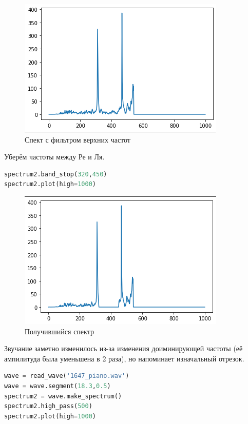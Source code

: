 \begin{figure}[H]
	\begin{center}
		\includegraphics[scale=1]{fig/lab01/lab1_5.png}
		\caption{Спект с фильтром верхних частот}
	\end{center}
\end{figure}

Уберём частоты между Ре и Ля.

\begin{lstlisting}[language=Python]
spectrum2.band_stop(320,450)
spectrum2.plot(high=1000)
\end{lstlisting}



\begin{figure}[H]
	\begin{center}
		\includegraphics[scale=1]{fig/lab01/lab1_6.png}
		\caption{Получившийся спектр}
	\end{center}
\end{figure}

Звучание заметно изменилось из-за изменения доиминирующей частоты (её ампилитуда была уменьшена в 2 раза), но напоминает изначальный отрезок.

\begin{lstlisting}[language=Python]
wave = read_wave('1647_piano.wav')
wave = wave.segment(18.3,0.5)
spectrum2 = wave.make_spectrum()
spectrum2.high_pass(500)
spectrum2.plot(high=1000)
\end{lstlisting}


